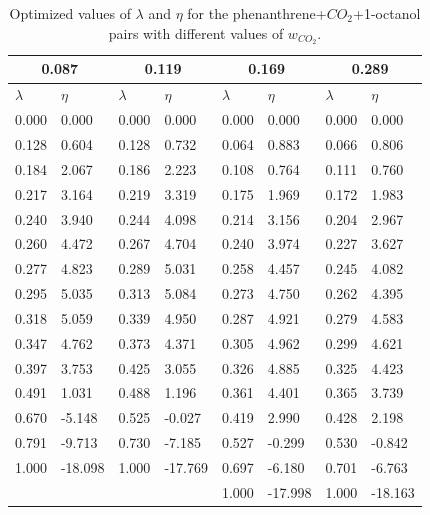 \begin{table}[h]
	\centering
	\caption{Optimized values of $\lambda $ and $\eta $ for the phenanthrene+$CO_{2}$+1-octanol pairs with different values of $w_{CO_{2}}$.}
	\begin{tabular}{llllllll}
		\hline
		\multicolumn{2}{c}{0.087}& \multicolumn{2}{c}{0.119}& \multicolumn{2}{c}{0.169}& \multicolumn{2}{c}{0.289}\\
		\hline\hline
		$\lambda$ & $\eta$ & $\lambda$ & $\eta$  & $\lambda$ & $\eta$  & $\lambda$ & $\eta$ \\ 
		\hline\hline
		0.000	&	0.000	&	0.000	&	0.000	&	0.000	&	0.000	&	0.000	&	0.000	\\
		0.128	&	0.604	&	0.128	&	0.732	&	0.064	&	0.883	&	0.066	&	0.806	\\
		0.184	&	2.067	&	0.186	&	2.223	&	0.108	&	0.764	&	0.111	&	0.760	\\
		0.217	&	3.164	&	0.219	&	3.319	&	0.175	&	1.969	&	0.172	&	1.983	\\
		0.240	&	3.940	&	0.244	&	4.098	&	0.214	&	3.156	&	0.204	&	2.967	\\
		0.260	&	4.472	&	0.267	&	4.704	&	0.240	&	3.974	&	0.227	&	3.627	\\
		0.277	&	4.823	&	0.289	&	5.031	&	0.258	&	4.457	&	0.245	&	4.082	\\
		0.295	&	5.035	&	0.313	&	5.084	&	0.273	&	4.750	&	0.262	&	4.395	\\
		0.318	&	5.059	&	0.339	&	4.950	&	0.287	&	4.921	&	0.279	&	4.583	\\
		0.347	&	4.762	&	0.373	&	4.371	&	0.305	&	4.962	&	0.299	&	4.621	\\
		0.397	&	3.753	&	0.425	&	3.055	&	0.326	&	4.885	&	0.325	&	4.423	\\
		0.491	&	1.031	&	0.488	&	1.196	&	0.361	&	4.401	&	0.365	&	3.739	\\
		0.670	&	-5.148	&	0.525	&	-0.027	&	0.419	&	2.990	&	0.428	&	2.198	\\
		0.791	&	-9.713	&	0.730	&	-7.185	&	0.527	&	-0.299	&	0.530	&	-0.842	\\
		1.000	&	-18.098	&	1.000	&	-17.769	&	0.697	&	-6.180	&	0.701	&	-6.763	\\
		&		&		&		&	1.000	&	-17.998	&	1.000	&	-18.163	\\
		\hline\hline
	\end{tabular}
\end{table}


